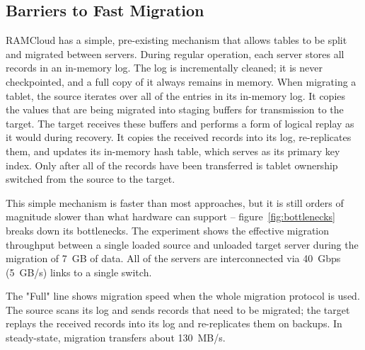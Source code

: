 \subsection{Barriers to Fast Migration}
\label{sec:bottlenecks}

RAMCloud has a simple, pre-existing mechanism that allows tables to be split
and migrated between servers.
During regular operation, each server stores
all records in an in-memory log. The log is incrementally cleaned; it is
never checkpointed, and a full copy of it always remains in memory.
When migrating a tablet,
the source iterates over all of the entries in its
in-memory log. It copies the values that are being migrated into staging buffers for
transmission to the target. The target receives these buffers and performs a
form of logical replay as it would during recovery. It copies the received
records into its log, re-replicates them, and updates its in-memory hash
table, which serves as its primary key index. Only after all of the records
have been transferred is tablet ownership switched from the source to
the target.

This simple mechanism is faster than most
approaches,
but it is still orders of
magnitude slower than what hardware can support -- figure~\ref{fig:bottlenecks}
breaks down its bottlenecks. The
experiment shows the effective migration throughput between a single loaded
source and unloaded target server during the migration of
7~GB of data.  All of the servers are interconnected via 40~Gbps (5~GB/s) links
to a single switch.

The "Full" line shows migration speed when the whole migration
protocol is used. The source scans its log and sends records that need to
be migrated; the target replays the received records into its log and
re-replicates them on backups.
In steady-state, migration transfers about 130~MB/s.

